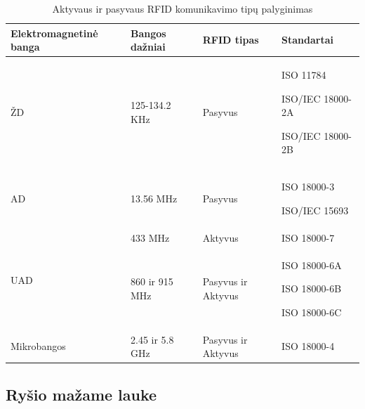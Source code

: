 \begin{table}[!ht]
    \centering
    \renewcommand{\arraystretch}{1,5}
    \begin{tabular}{m{9em}m{8em}m{8em}m{8em}} 
        \hline
        Elektromagnetinė banga            & Bangos dažniai    & RFID tipas    &Standartai   \\ 
        \hline
        ŽD                     & 125-134.2 KHz & Pasyvus & ISO 11784 \par ISO/IEC 18000-2A \par ISO/IEC 18000-2B   \\ 
        \hline
        AD                     & 13.56 MHz & Pasyvus  &  ISO 18000-3 \par ISO/IEC 15693 \\ 
        \hline
        \multirow{2}{*}{UAD} & 433 MHz       & Aktyvus   &  ISO 18000-7    \\ 
        \cline{2-4}
                                & 860 ir 915 MHz      &  Pasyvus ir Aktyvus  &  ISO 18000-6A \par ISO 18000-6B \par ISO 18000-6C    \\ 
        \hline
        Mikrobangos                       & 2.45 ir 5.8 GHz         & Pasyvus ir Aktyvus &  ISO 18000-4  \\
        \hline
    \end{tabular}
    \caption{Aktyvaus ir pasyvaus RFID komunikavimo tipų palyginimas}
\end{table}

\subsection{Ryšio mažame lauke}

